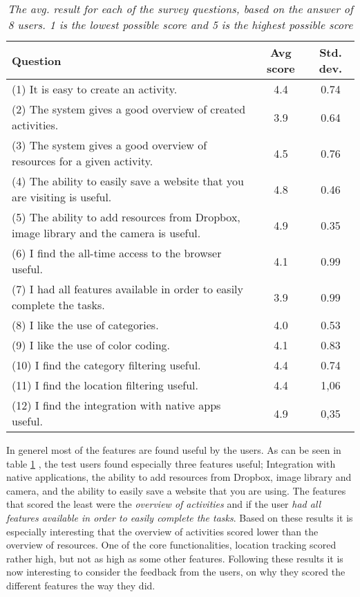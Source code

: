 \begin{table}[ht]
\begin{center}
    \begin{tabular}{ | p{7cm} | c | c |}
    \hline
    \textbf{Question} & \textbf{Avg score} & \textbf{Std. dev.}\\ \hline
    		(1) It is easy to create an activity. & 4.4 & 0.74 \\ \hline 
		(2) The system gives a good overview of created activities. & 3.9 & 0.64 \\ \hline
		(3) The system gives a good overview of resources for a given activity. & 4.5 & 0.76 \\ \hline
		(4) The ability to easily save a website that you are visiting is useful. & 4.8 & 0.46 \\ \hline
		(5) The ability to add resources from Dropbox, image library and the camera is useful. & 4.9 & 0.35 \\ \hline
		(6) I find the all-time access to the browser useful. & 4.1 & 0.99\\ \hline
		(7) I had all features available in order to easily complete the tasks. & 3.9 & 0.99 \\ \hline
		(8) I like the use of categories. & 4.0 & 0.53 \\ \hline
		(9) I like the use of color coding. & 4.1 & 0.83\\ \hline
		(10) I find the category filtering useful. & 4.4 & 0.74\\ \hline
		(11) I find the location filtering useful. & 4.4 & 1,06\\ \hline
		(12) I find the integration with native apps useful. & 4.9 & 0,35\\ \hline
	\end{tabular}
\end{center}
\caption{\emph{The avg. result for each of the survey questions, based on the answer of 8 users. 1 is the lowest possible score and 5 is the highest possible score}}
\label{table:quantitativeResult}
\end{table}

In generel most of the features are found useful by the users. As can be seen in table \ref{table:quantitativeResult} , the test users found especially three features useful; Integration with native applications, the ability to add resources from Dropbox, image library and camera, and the ability to easily save a website that you are using. The features that scored the least were the \emph{overview of activities} and if the user \emph{had all features available in order to easily complete the tasks}. Based on these results it is especially interesting that the overview of activities scored lower than the overview of resources. One of the core functionalities, location tracking scored rather high, but not as high as some other features. Following these results it is now interesting to consider the feedback from the users, on why they scored the different features the way they did.

